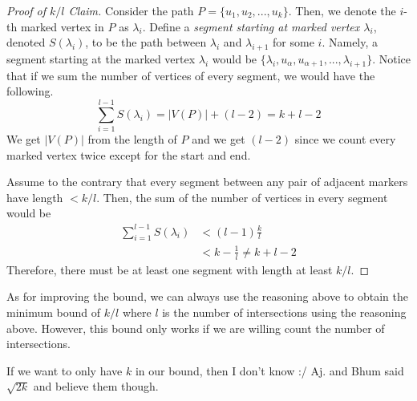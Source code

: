 \begin{hwproblem}{6}
  \begin{proof}[Proof of \(k/l\) Claim]
    Consider the path \(P = \{u_1, u_2, ..., u_k\}\). Then, we denote the
    \(i\)-th marked vertex in \(P\) as \(\lambda_i\). Define a \textit{segment
    starting at marked vertex \(\lambda_i\)}, denoted \(S(\lambda_i)\),
    to be the path between \(\lambda_{i}\) and \(\lambda_{i+1}\) for some
    \(i\). Namely, a segment starting at the marked vertex \(\lambda_i\) would
    be \(\{\lambda_i, u_{\alpha}, u_{\alpha+1}, ..., \lambda_{i+1}\}\).
    Notice that if we sum the number of vertices of every segment, we would have
    the following.
    \[ \sum_{i=1}^{l-1} S(\lambda_i) = |V(P)| + (l - 2) = k+l-2 \]
    We get \(|V(P)|\) from the length of \(P\) and we get \((l-2)\) since we 
    count every marked vertex twice except for the start and end.

    Assume to the contrary that every segment between any pair of
    adjacent markers have length \(< k/l\). Then, the sum of the number of
    vertices in every segment would be
    \[
      \begin{aligned}
        \sum_{i=1}^{l-1} S(\lambda_i) &< (l-1)\frac{k}{l} \\
                                      &< k - \frac{1}{l} \neq k+l-2
      \end{aligned}
    \]
    Therefore, there must be at least one segment with length at least \(k/l\).
  \end{proof}

  As for improving the bound, we can always use the reasoning above to obtain
  the minimum bound of \(k/l\) where \(l\) is the number of intersections using
  the reasoning above. However, this bound only works if we are willing count
  the number of intersections.

  If we want to only have \(k\) in our bound, then I don't know :/ Aj. and Bhum said
  \(\sqrt{2k}\) and believe them though.
\end{hwproblem}
